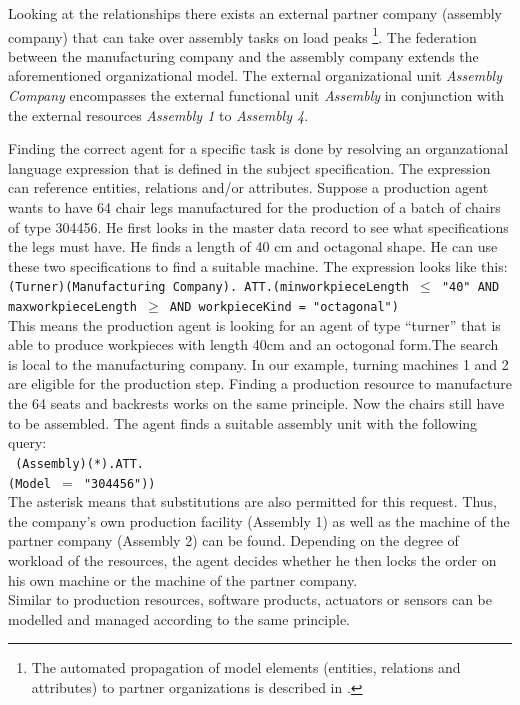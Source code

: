 Looking at the relationships there exists an external partner company (assembly company) that can take over assembly tasks on load peaks
\footnote{The automated propagation of model elements (entities, relations and attributes) to partner organizations is described in \cite{Lawall2014a}.}. The federation between the manufacturing company and the assembly company extends the aforementioned organizational model. The external organizational unit \emph{Assembly Company} encompasses the external functional unit \emph{Assembly} in conjunction with the external resources \emph{Assembly 1} to \emph{Assembly 4}. 


Finding the correct agent for a specific task is done by resolving an organzational language expression that is defined in the subject specification.
The expression can reference entities, relations and/or attributes. 
Suppose a production agent wants to have 64 chair legs manufactured for the production of a batch of chairs of type 304456. He first looks in the master data record to see what specifications the legs must have. He finds a length of 40 cm and octagonal shape. He can use these two specifications to find a suitable machine. The expression looks like this:\\

\texttt{(Turner)(Manufacturing Company). ATT.(minworkpieceLength $\leq$ "40" AND maxworkpieceLength $\geq$ AND workpieceKind = "octagonal")}\\

This means the production agent is looking for an agent of type "`turner"' that is able to produce workpieces with length 40cm and an octogonal form.The
search is local to the manufacturing company. In our example, turning machines 1 and 2 are eligible for the production step.
Finding a production resource to manufacture the 64 seats and backrests works on the same principle. Now the chairs still have to be assembled. The agent finds a suitable assembly unit with the following query:\\

\texttt{ (Assembly)(*).ATT.\\(Model $=$ "304456"))} \\
 
The asterisk means that substitutions are also permitted for this request. Thus, the company's own production facility (Assembly 1) as well as the machine of the partner company (Assembly 2) can be found. Depending on the degree of workload of the resources, the agent decides whether he then locks the order on his own machine or the machine of the partner company. \\

Similar to production resources, software products, actuators or sensors can be modelled and managed according to the same principle. 


